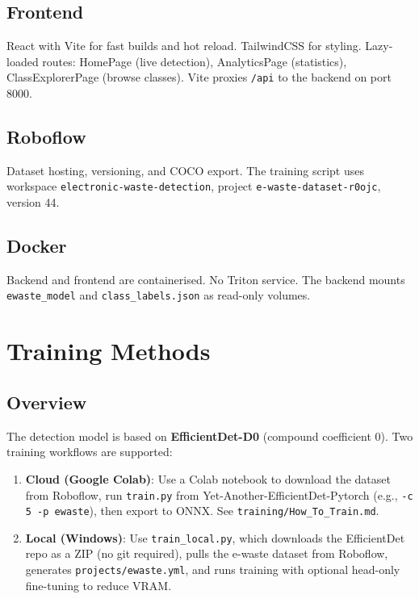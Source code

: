 \documentclass[11pt,a4paper]{article}
\begin{document}
\subsection{Frontend}

React with Vite for fast builds and hot reload. TailwindCSS for styling. Lazy-loaded routes: HomePage (live detection), AnalyticsPage (statistics), ClassExplorerPage (browse classes). Vite proxies \texttt{/api} to the backend on port 8000.

\subsection{Roboflow}

Dataset hosting, versioning, and COCO export. The training script uses workspace \texttt{electronic-waste-detection}, project \texttt{e-waste-dataset-r0ojc}, version 44.

\subsection{Docker}

Backend and frontend are containerised. No Triton service. The backend mounts \texttt{ewaste\_model} and \texttt{class\_labels.json} as read-only volumes.

\section{Training Methods}
\label{sec:training}

\subsection{Overview}

The detection model is based on \textbf{EfficientDet-D0} (compound coefficient 0). Two training workflows are supported:

\begin{enumerate}
    \item \textbf{Cloud (Google Colab)}: Use a Colab notebook to download the dataset from Roboflow, run \texttt{train.py} from Yet-Another-EfficientDet-Pytorch (e.g., \texttt{-c 5 -p ewaste}), then export to ONNX. See \texttt{training/How\_To\_Train.md}.
    \item \textbf{Local (Windows)}: Use \texttt{train\_local.py}, which downloads the EfficientDet repo as a ZIP (no git required), pulls the e-waste dataset from Roboflow, generates \texttt{projects/ewaste.yml}, and runs training with optional head-only fine-tuning to reduce VRAM.
\end{enumerate}
\end{document}
